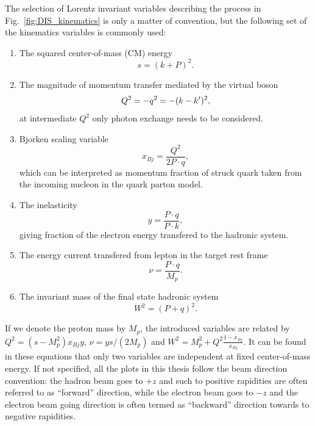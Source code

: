 The selection of Lorentz invariant variables describing the process in
Fig.~\ref{fig:DIS_kinematics} is only a matter of convention, but the following
set of the kinematics variables is commonly used:
\begin{enumerate}
\item The squared center-of-mass (CM) energy
\begin{equation}
	s = (k+P)^{2}.
\end{equation}

\item The magnitude of momentum transfer mediated by the virtual boson
\begin{equation}
Q^{2} = -q^{2} = -(k-k^{\prime})^{2},
\end{equation}
at intermediate $Q^{2}$ only photon exchange needs to be considered.

\item Bjorken scaling variable
\begin{equation}
x_{Bj} = \frac{Q^{2}}{2P\cdot q},
\end{equation}
which can be interpreted as momentum fraction of
struck quark taken from the incoming nucleon in the quark parton model.

\item The inelasticity
\begin{equation}
y = \frac{P\cdot q}{ P\cdot k},
\end{equation}
giving fraction of the electron energy transfered to
the hadronic system.

\item The energy current transfered from lepton in the target rest frame
\begin{equation}
\nu = \frac{P\cdot q}{ M_{p} }.
\end{equation}

\item The invariant mass of the final state hadronic system
\begin{equation}
W^{2} = (P+q)^{2}.
\end{equation}

\end{enumerate}

If we denote the proton mass by $M_{p}$, the introduced variables are related by
$Q^{2}=(s-M^{2}_{p})x_{Bj}y$, $\nu = ys/(2M_{p})$ and
$W^{2}=M^{2}_{p}+Q^{2}\frac{1-x_{Bj}}{x_{Bj}}$. It can be found in these
equations that only two variables are independent at fixed center-of-mass
energy. If not specified, all the plots in this thesis follow the beam direction
convention: the hadron beam goes to $+z$ and such to positive rapidities are
often referred to as ``forward'' direction, while the electron beam goes to $-z$
and the electron beam going direction is often termed as ``backward'' direction
towards to negative rapidities.




